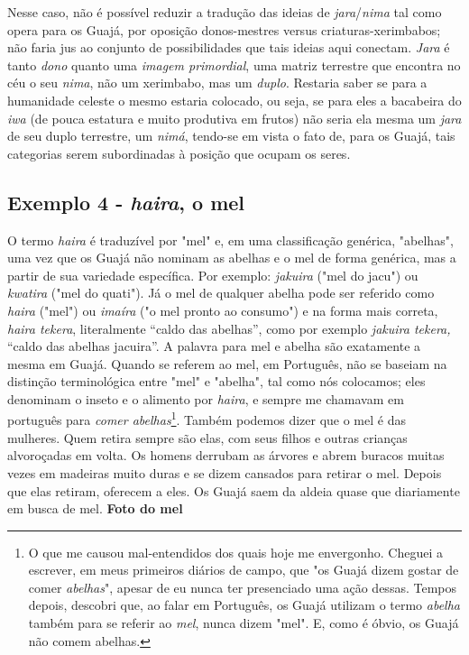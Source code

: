 Nesse caso, não é possível reduzir a tradução das ideias de
\emph{jara}/\emph{nima} tal como opera para os Guajá, por oposição
donos-mestres versus criaturas-xerimbabos; não faria jus ao conjunto de
possibilidades que tais ideias aqui conectam. \emph{Jara} é tanto
\emph{dono} quanto uma \emph{imagem primordial}, uma matriz terrestre
que encontra no céu o seu \emph{nima}, não um xerimbabo, mas um
\emph{duplo}. Restaria saber se para a humanidade celeste o mesmo
estaria colocado, ou seja, se para eles a bacabeira do \emph{iwa} (de
pouca estatura e muito produtiva em frutos) não seria ela mesma um
\emph{jara} de seu duplo terrestre, um \emph{nimá}, tendo-se em vista o
fato de, para os Guajá, tais categorias serem subordinadas à posição que
ocupam os seres.

\subsection{Exemplo 4 - \emph{haira}, o mel}

O termo \emph{haira} é traduzível por "mel" e, em uma classificação
genérica, "abelhas", uma vez que os Guajá não nominam as abelhas e o mel
de forma genérica, mas a partir de sua variedade específica. Por
exemplo: \emph{jakuira} ("mel do jacu") ou \emph{kwatira} ("mel do
quati"). Já o mel de qualquer abelha pode ser referido como \emph{haira}
("mel") ou \emph{imaíra} ("o mel pronto ao consumo") e na forma mais
correta, \emph{haira tekera}, literalmente ``caldo das abelhas'', como
por exemplo \emph{jakuira tekera,} ``caldo das abelhas jacuira''. A
palavra para mel e abelha são exatamente a mesma em Guajá. Quando se
referem ao mel, em Português, não se baseiam na distinção terminológica
entre "mel" e "abelha", tal como nós colocamos; eles denominam o inseto
e o alimento por \emph{haira}, e sempre me chamavam em português para
\emph{comer abelhas}\footnote{O que me causou mal-entendidos dos quais
  hoje me envergonho. Cheguei a escrever, em meus primeiros diários de
  campo, que "os Guajá dizem gostar de comer \emph{abelhas}", apesar de
  eu nunca ter presenciado uma ação dessas. Tempos depois, descobri que,
  ao falar em Português, os Guajá utilizam o termo \emph{abelha} também
  para se referir ao \emph{mel}, nunca dizem "mel". E, como é óbvio, os
  Guajá não comem abelhas.}. Também podemos dizer que o mel é das
mulheres. Quem retira sempre são elas, com seus filhos e outras crianças
alvoroçadas em volta. Os homens derrubam as árvores e abrem buracos
muitas vezes em madeiras muito duras e se dizem cansados para retirar o
mel. Depois que elas retiram, oferecem a eles. Os Guajá saem da aldeia
quase que diariamente em busca de mel. \textbf{Foto do mel}

